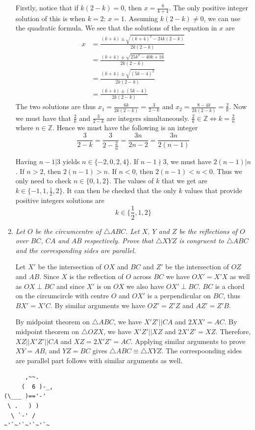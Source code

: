 \documentclass{article}
\begin{document}
\begin{enumerate}[1.]
Firstly, notice that if $k(2 - k) = 0$, then $x = \frac{6}{k + 4}$. The only positive integer solution of this is when $k = 2$: $x = 1$.
Assuming $k(2 - k) \ne 0$, we can use the quadratic formula. We see that the solutions of the equation in $x$ are
\begin{align*}
    x &= \frac{(k + 4) \pm \sqrt{(k + 4)^2 - 24k(2 - k)}}{2k(2 - k)} \\
    &= \frac{(k + 4) \pm \sqrt{25k^2 - 40k + 16}}{2k(2 - k)} \\
    &= \frac{(k + 4) \pm \sqrt{(5k - 4)^2}}{2k(2 - k)} \\
    &= \frac{(k + 4) \pm (5k - 4)}{2k(2 - k)}
\end{align*}
The two solutions are thus $x_1 = \frac{6k}{2k(2 - k)} = \frac{3}{2 - k}$ and $x_2 = \frac{8 - 4k}{2k(2 - k)} = \frac{2}{k}$. Now we must have that $\frac{2}{k}$ and $\frac{3}{2 - k}$ are integers simultaneously. $\frac{2}{k} \in \mathbb{Z} \iff k = \frac{2}{n}$ where $n \in \mathbb{Z}$. Hence we must have the following is an integer 
$$\frac{3}{2 - k} = \frac{3}{2 - \frac{2}{n}} = \frac{3n}{2n - 2}= \frac{3n}{2(n - 1)}$$

Having $n - 1 | 3$ yields $n \in \{-2, 0, 2, 4\}$. If $n - 1 \nmid 3$, we must have $2(n - 1) | n$. If $n > 2$, then $2(n - 1) > n$. If $n < 0$, then $2(n - 1) < n < 0$. Thus we only need to check $n \in \{0, 1, 2\}$. The values of $k$ that we get are $k \in \{-1, 1, \frac{1}{2}, 2\}$. It can then be checked that the only $k$ values that provide positive integers solutions are 
$$k \in \{\frac{1}{2}, 1, 2\}$$

\item %
{\itshape Let $O$ be the circumcentre of $\triangle ABC$. Let $X$, $Y$ and $Z$ be the reflections of $O$ over $BC$, $CA$ and $AB$ respectively. Prove that $\triangle XYZ$ is congruent to $\triangle ABC$ and the corresponding sides are parallel.}

Let $X'$ be the intersection of $OX$ and $BC$ and $Z'$ be the intersection of $OZ$ and $AB$. Since $X$ is the reflection of $O$ across $BC$ we have $OX' = X'X$ as well as $OX \perp BC$ and since $X'$ is on $OX$ we also have $OX' \perp BC$. $BC$ is a chord on the circumcircle with centre $O$ and $OX'$ is a perpendicular on $BC$, thus $BX' = X'C$. By similar arguments we have $OZ' = Z'Z$ and $AZ' = Z'B$. 

By midpoint theorem on $\triangle ABC$, we have $X'Z'||CA$ and $2XX' = AC$. By midpoint theorem on $\triangle OZX$, we have $X'Z'||XZ$ and $2X'Z' = XZ$. Therefore, $XZ||X'Z'||CA$ and $XZ = 2X'Z' = AC$. Applying similar arguments to prove $XY = AB$, and $YZ = BC$ gives $\triangle ABC \equiv \triangle XYZ$. The correspoonding sides are parallel part follows with similar arguments as well. 



\end{enumerate}


\vfill
\centering
\begin{BVerbatim}
      ,~~.
     (  6 )-_,
(\___ )=='-'
 \ .   ) )
  \ `-' /    
~'`~'`~'`~'`~
\end{BVerbatim}
\end{document}
